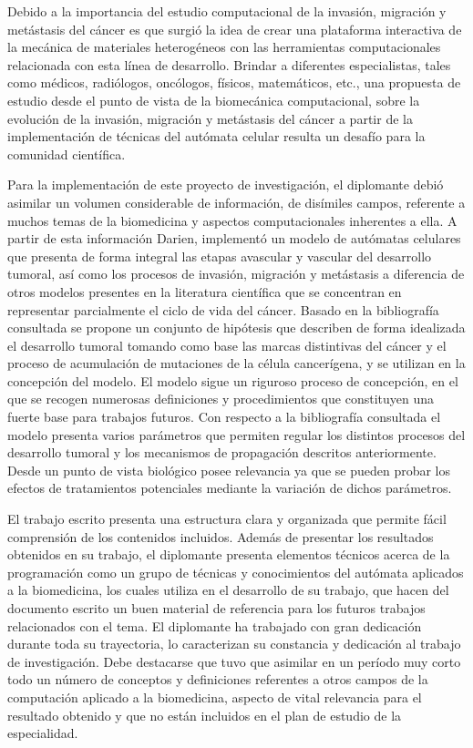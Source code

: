 Debido a la importancia del estudio computacional de la invasi\'on, migraci\'on y met\'astasis del c\'ancer es que surgi\'o la idea de crear una plataforma interactiva de la mec\'anica de materiales heterog\'eneos con las herramientas computacionales relacionada con esta l\'inea de desarrollo. Brindar a diferentes especialistas, tales como m\'edicos, radi\'ologos, onc\'ologos, f\'isicos, matem\'aticos, etc., una propuesta de estudio desde el punto de vista de la biomec\'anica computacional, sobre la evoluci\'on de la invasi\'on, migraci\'on y met\'astasis del c\'ancer a partir de la implementaci\'on de t\'ecnicas del aut\'omata celular resulta un desaf\'io para la comunidad cient\'ifica. 

Para la implementaci\'on de este proyecto de investigaci\'on, el diplomante debi\'o asimilar un volumen considerable de informaci\'on, de dis\'imiles campos, referente a muchos temas de la biomedicina y aspectos computacionales inherentes a ella. A partir de esta informaci\'on Darien, implement\'o un modelo de aut\'omatas celulares que presenta de forma integral las etapas avascular y vascular del desarrollo tumoral, as\'i como los procesos de invasi\'on, migraci\'on y met\'astasis a diferencia de otros modelos presentes en la literatura cient\'ifica que se concentran en representar parcialmente el ciclo de vida del c\'ancer. Basado en la bibliograf\'ia consultada se propone un conjunto de hip\'otesis que describen de forma idealizada el desarrollo tumoral tomando como base las marcas distintivas del c\'ancer y el proceso de acumulaci\'on de mutaciones de la c\'elula cancer\'igena, y se utilizan en la concepci\'on del modelo. El modelo sigue un riguroso proceso de concepci\'on, en el que se recogen numerosas definiciones y procedimientos que constituyen una fuerte base para trabajos futuros. Con respecto a la bibliograf\'ia consultada el modelo presenta varios par\'ametros que permiten regular los distintos procesos del desarrollo tumoral y los mecanismos de propagaci\'on descritos anteriormente. Desde un punto de vista biol\'ogico posee relevancia ya que se pueden probar los efectos de tratamientos potenciales mediante la variaci\'on de dichos par\'ametros. 

El trabajo escrito presenta una estructura clara y organizada que permite f\'acil comprensi\'on de los contenidos incluidos. Adem\'as de presentar los resultados obtenidos en su trabajo, el diplomante presenta elementos t\'ecnicos acerca de la programaci\'on como un grupo de t\'ecnicas y conocimientos del aut\'omata aplicados a la biomedicina, los cuales utiliza en el desarrollo de su trabajo, que hacen del documento escrito un buen material de referencia para los futuros trabajos relacionados con el tema.
El diplomante ha trabajado con gran dedicaci\'on durante toda su trayectoria, lo caracterizan su constancia y dedicaci\'on al trabajo de investigaci\'on. Debe destacarse que tuvo que asimilar en un per\'iodo muy corto todo un n\'umero de conceptos y definiciones referentes a otros campos de la computaci\'on aplicado a la biomedicina, aspecto de vital relevancia para el resultado obtenido y que no est\'an incluidos en el plan de estudio de la especialidad. 
